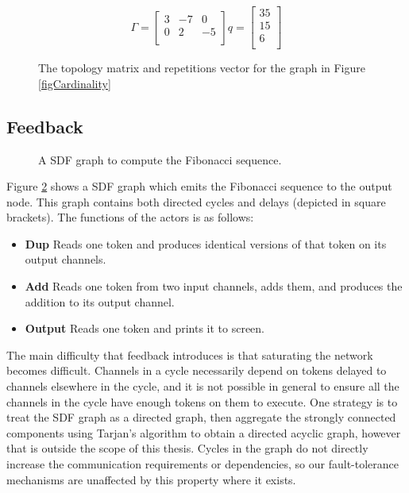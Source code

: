 \begin{figure}
\begin{center}
\[
 \Gamma = \begin{bmatrix}
	3 & -7 & 0 \\
	0 & 2 & -5 \\
     \end{bmatrix}
	q = \begin{bmatrix}
	35 \\
	15 \\
	6 \\
     \end{bmatrix}
\]
\caption{The topology matrix and repetitions vector for the graph in Figure \ref{figCardinality}}
\label{figCardinalityMaths}
\end{center}
\end{figure}

\subsection{Feedback}

\begin{figure}
\begin{center}
	
\caption{A SDF graph to compute the Fibonacci sequence.}
\label{figFibonacci}
\end{center}
\end{figure}

Figure \ref{figFibonacci} shows a SDF graph which emits the Fibonacci sequence to the output node.
This graph contains both directed cycles and delays (depicted in square brackets).
The functions of the actors is as follows:
\begin{itemize}
	\item {\bf Dup} Reads one token and produces identical versions of that token on its output channels.
	\item {\bf Add} Reads one token from two input channels, adds them, and produces the addition to its output channel.
	\item {\bf Output} Reads one token and prints it to screen.
\end{itemize}

The main difficulty that feedback introduces is that saturating the network becomes difficult.
Channels in a cycle necessarily depend on tokens delayed to channels elsewhere in the cycle, and it is not possible in general to ensure all the channels in the cycle have enough tokens on them to execute.
One strategy is to treat the SDF graph as a directed graph, then aggregate the strongly connected components using Tarjan's algorithm to obtain a directed acyclic graph, however that is outside the scope of this thesis.
Cycles in the graph do not directly increase the communication requirements or dependencies, so our fault-tolerance mechanisms are unaffected by this property where it exists.
